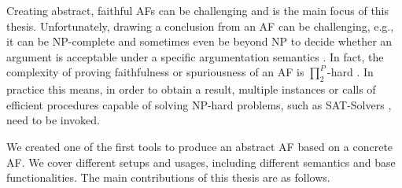 Creating abstract, faithful AFs can be challenging and is the main focus of this thesis. Unfortunately, drawing a conclusion from an AF can be challenging, e.g., it can be NP-complete and sometimes even be beyond NP to decide whether an argument is acceptable under a specific argumentation semantics \cite{DvorakD18}. In fact, the complexity of proving faithfulness or spuriousness of an AF is $\prod_2^P$-hard \cite{DBLP:conf/kr/SaribaturW21}. In practice this means, in order to obtain a result, multiple instances or calls of efficient procedures capable of solving NP-hard problems, such as SAT-Solvers \cite{BacchusJM21}, need to be invoked.

We created one of the first tools to produce an abstract AF based on a concrete AF. We cover different setups and usages, including different semantics and base functionalities. The main contributions of this thesis are as follows.


